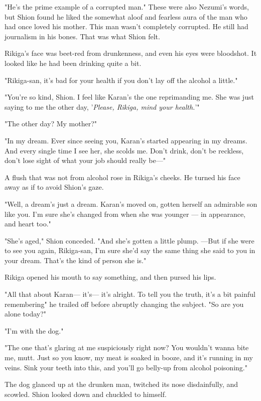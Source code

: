 "He's the prime example of a corrupted man." These were also Nezumi's
words, but Shion found he liked the somewhat aloof and fearless aura of
the man who had once loved his mother. This man wasn't completely
corrupted. He still had journalism in his bones. That was what Shion
felt.

Rikiga's face was beet-red from drunkenness, and even his eyes were
bloodshot. It looked like he had been drinking quite a bit.

"Rikiga-san, it's bad for your health if you don't lay off the alcohol a
little."

"You're so kind, Shion. I feel like Karan's the one reprimanding me. She
was just saying to me the other day, '\emph{Please, Rikiga, mind your
health.}'"

"The other day? My mother?"

"In my dream. Ever since seeing you, Karan's started appearing in my
dreams. And every single time I see her, she scolds me. Don't drink,
don't be reckless, don't lose sight of what your job should really be---"

A flush that was not from alcohol rose in Rikiga's cheeks. He turned his
face away as if to avoid Shion's gaze.

"Well, a dream's just a dream. Karan's moved on, gotten herself an
admirable son like you. I'm sure she's changed from when she was younger
--- in appearance, and heart too."

"She's aged," Shion conceded. "And she's gotten a little plump. ---But if
she were to see you again, Rikiga-san, I'm sure she'd say the same thing
she said to you in your dream. That's the kind of person she is."

Rikiga opened his mouth to say something, and then pursed his lips.

"All that about Karan--- it's--- it's alright. To tell you the truth, it's a
bit painful remembering\el " he trailed off before abruptly changing the
subject. "So are you alone today?"

"I'm with the dog."

"The one that's glaring at me suspiciously right now? You wouldn't wanna
bite me, mutt. Just so you know, my meat is soaked in booze, and it's
running in my veins. Sink your teeth into this, and you'll go belly-up
from alcohol poisoning."

The dog glanced up at the drunken man, twitched its nose disdainfully,
and scowled. Shion looked down and chuckled to himself.

